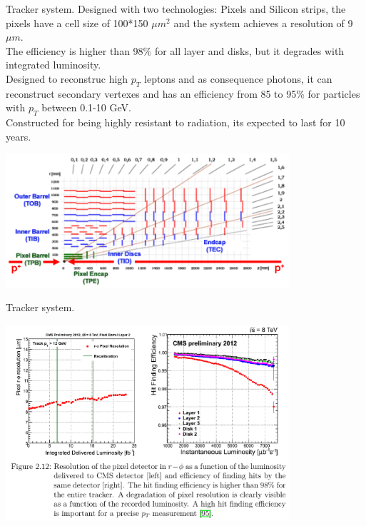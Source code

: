 \documentclass[8pt]{beamer}
\begin{document}
\begin{frame}[fragile]{Tracker system.}
	Designed with two technologies: Pixels and Silicon strips, 
	the pixels have a cell size of 100*150 $\mu m^2$ and the system achieves a resolution of 9$\mu m$.
	\\
	The efficiency is higher than 98\% for all layer and disks, but it degrades with integrated luminosity.
	\\
	Designed to reconstruc high $p_T$ leptons and as consequence photons, it can reconstruct secondary vertexes and has an efficiency from 85 to 95\% for particles with $p_T$ between 0.1-10 GeV.
	\\ Constructed for being highly resistant to radiation, its expected to last for 10 years. 
	

		\includegraphics[width=10.5cm]{11}

\end{frame}


\begin{frame}[fragile]{Tracker system.}
	
	
	\includegraphics[width=10.5cm]{12}
	
\end{frame}


\end{document}
